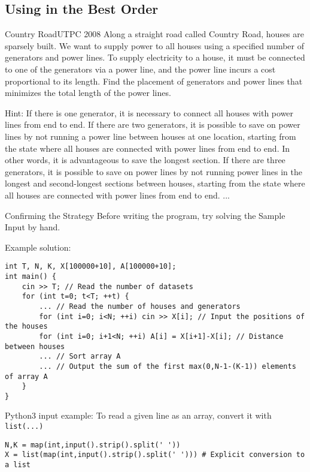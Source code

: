\subsection{Using in the Best Order}
\begin{pbox}{Country Road}{UTPC 2008}
Along a straight road called Country Road, houses are sparsely built. We want to supply power to all houses using a specified number of generators and power lines. To supply electricity to a house, it must be connected to one of the generators via a power line, and the power line incurs a cost proportional to its length. Find the placement of generators and power lines that minimizes the total length of the power lines.

\end{pbox}

Hint: If there is one generator, it is necessary to connect all houses with power lines from end to end. If there are two generators, it is possible to save on power lines by not running a power line between houses at one location, starting from the state where all houses are connected with power lines from end to end. In other words, it is advantageous to save the longest section. If there are three generators, it is possible to save on power lines by not running power lines in the longest and second-longest sections between houses, starting from the state where all houses are connected with power lines from end to end. ...

\begin{tipsbox}{Confirming the Strategy}
Before writing the program, try solving the Sample Input by hand.
\end{tipsbox}

Example solution:
\begin{cbox}
\begin{verbatim}
int T, N, K, X[100000+10], A[100000+10];
int main() {
    cin >> T; // Read the number of datasets
    for (int t=0; t<T; ++t) {
        ... // Read the number of houses and generators
        for (int i=0; i<N; ++i) cin >> X[i]; // Input the positions of the houses
        for (int i=0; i+1<N; ++i) A[i] = X[i+1]-X[i]; // Distance between houses
        ... // Sort array A
        ... // Output the sum of the first max(0,N-1-(K-1)) elements of array A
    }
}
\end{verbatim}
\end{cbox}

Python3 input example: To read a given line as an array, convert it with \texttt{list(...)}
\begin{pybox}
\begin{verbatim}
N,K = map(int,input().strip().split(' '))
X = list(map(int,input().strip().split(' '))) # Explicit conversion to a list
\end{verbatim}
\end{pybox}

